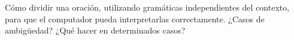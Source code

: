 Cómo dividir una oración, utilizando gramáticas independientes del contexto, para que el computador pueda interpretarlas correctamente. ¿Casos de ambigüedad? ¿Qué hacer en determinados casos?
